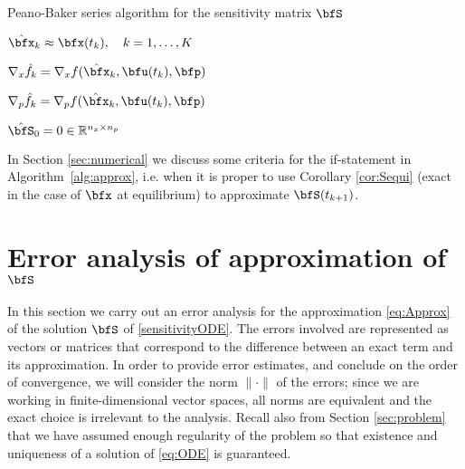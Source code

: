 \documentclass[DIV=12]{scrartcl} %
\theoremstyle{definition}
\begin{document}
\begin{algorithm}[H]
 \caption{Peano-Baker series algorithm for the sensitivity matrix $\bfS$ \label{alg:approx}}

\SetAlgoLined
{}
$\hat{\bfx}_k\approx \bfx(t_k),\quad k=1,\dots,K$\;

$\nabla_x\hat{f}_k = \nabla_xf(\hat{\bfx}_k,\bfu(t_k),\bfp)$\;

$\nabla_p\hat{f}_k = \nabla_pf(\hat{\bfx}_k,\bfu(t_k),\bfp)$\;

$\hat{\bfS}_0=0\in\mathbb{R}^{n_x\times n_p}$\;


\end{algorithm}
In Section \ref{sec:numerical} we discuss some criteria for the if-statement in Algorithm~\ref{alg:approx}, i.e. when it is proper to use Corollary \ref{cor:Sequi} (exact in the case of $\bfx$ at equilibrium) to approximate $\bfS(t_{k+1})$.

\section{Error analysis of approximation of $\bfS$}
\label{sec:errEst}

In this section we carry out an error analysis for the approximation \eqref{eq:Approx} of the solution $\bfS$ of \eqref{sensitivityODE}. The errors involved are represented as vectors or matrices that correspond to the difference between an exact term and its approximation. In order to provide error estimates, and conclude on the order of convergence, we will consider the norm $\|\cdot\|$ of the errors; since we are working in finite-dimensional vector spaces, all norms are equivalent and the exact choice is irrelevant to the analysis. Recall also from Section \ref{sec:problem} that we have assumed enough regularity of the problem so that  existence and uniqueness of a solution of \eqref{eq:ODE} is guaranteed.
\end{document}
